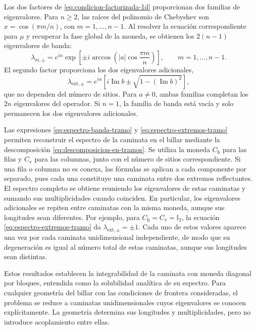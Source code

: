 \documentclass[12pt,a4paper,oneside]{report} %
\begin{document}
Los dos factores de \eqref{eq:condicion-factorizada-1d} proporcionan dos familias de eigenvalores. Para $n\geq2$, las raíces del polinomio de Chebyshev son $x=\cos(\pi m/n)$, con $m=1,\ldots,n-1$. Al resolver la ecuación correspondiente para $\mu$ y recuperar la fase global de la moneda, se obtienen los $2(n-1)$ eigenvalores de banda:
\begin{equation}
  \lambda_{m,\pm}
  =e^{i\alpha}
  \exp\!\left[
    \pm i\arccos\!\left(
      |a|\cos\frac{\pi m}{n}
    \right)
  \right],
  \qquad m=1,\ldots,n-1.
  \label{eq:espectro-banda-tramo}
\end{equation}
El segundo factor proporciona los dos eigenvalores adicionales,
\begin{equation}
  \lambda_{\mathrm{ext},\pm}
  =e^{i\alpha}
  \left[
    i\operatorname{Im}b
    \pm\sqrt{1-(\operatorname{Im}b)^2}
  \right],
  \label{eq:espectro-extremos-tramo}
\end{equation}
que no dependen del número de sitios. Para $a\neq0$, ambas familias completan los $2n$ eigenvalores del operador. Si $n=1$, la familia de banda está vacía y solo permanecen los dos eigenvalores adicionales.

Las expresiones \eqref{eq:espectro-banda-tramo} y \eqref{eq:espectro-extremos-tramo} permiten reconstruir el espectro de la caminata en el billar mediante la descomposición \eqref{eq:descomposicion-en-tramos}. Se utiliza la moneda $C_{\mathrm{h}}$ para las filas y $C_{\mathrm{v}}$ para las columnas, junto con el número de sitios correspondiente. Si una fila o columna no es conexa, las fórmulas se aplican a cada componente por separado, pues cada una constituye una caminata entre dos extremos reflectantes. El espectro completo se obtiene reuniendo los eigenvalores de estas caminatas y sumando sus multiplicidades cuando coinciden. En particular, los eigenvalores adicionales se repiten entre caminatas con la misma moneda, aunque sus longitudes sean diferentes. Por ejemplo, para $C_{\mathrm{h}}=C_{\mathrm{v}}=\mathbb I_2$, la ecuación \eqref{eq:espectro-extremos-tramo} da $\lambda_{\mathrm{ext},\pm}=\pm1$. Cada uno de estos valores aparece una vez por cada caminata unidimensional independiente, de modo que su degeneración es igual al número total de estas caminatas, aunque sus longitudes sean distintas.

Estos resultados establecen la integrabilidad de la caminata con moneda diagonal por bloques, entendida como la solubilidad analítica de su espectro. Para cualquier geometría del billar con las condiciones de frontera consideradas, el problema se reduce a caminatas unidimensionales cuyos eigenvalores se conocen explícitamente. La geometría determina sus longitudes y multiplicidades, pero no introduce acoplamiento entre ellas.
\end{document}

